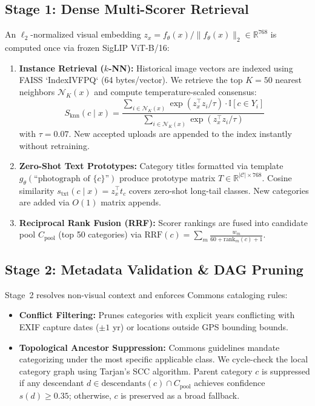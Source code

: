 \documentclass[10pt,a4paper,twocolumn]{article}
\begin{document}
\subsection{Stage 1: Dense Multi-Scorer Retrieval}
An $\ell_2$-normalized visual embedding $z_x = f_\theta(x) / \|f_\theta(x)\|_2 \in \mathbb{R}^{768}$ is computed once via frozen SigLIP ViT-B/16:
\begin{enumerate}[noitemsep,topsep=1pt,leftmargin=*]
  \item \textbf{Instance Retrieval ($k$-NN):} Historical image vectors are indexed using FAISS `IndexIVFPQ` (64 bytes/vector). We retrieve the top $K=50$ nearest neighbors $\mathcal{N}_K(x)$ and compute temperature-scaled consensus:
  $$S_{\text{knn}}(c \mid x) = \frac{\sum_{i \in \mathcal{N}_K(x)} \exp(z_x^\top z_i / \tau) \cdot \mathbb{I}[c \in Y_i]}{\sum_{i \in \mathcal{N}_K(x)} \exp(z_x^\top z_i / \tau)}$$
  with $\tau=0.07$. New accepted uploads are appended to the index instantly without retraining.
  \item \textbf{Zero-Shot Text Prototypes:} Category titles formatted via template $g_\theta(\text{``photograph of } \{c\}\text{''})$ produce prototype matrix $T \in \mathbb{R}^{|\mathcal{C}| \times 768}$. Cosine similarity $s_{\text{txt}}(c \mid x) = z_x^\top t_c$ covers zero-shot long-tail classes. New categories are added via $O(1)$ matrix appends.
  \item \textbf{Reciprocal Rank Fusion (RRF):} Scorer rankings are fused into candidate pool $C_{\text{pool}}$ (top 50 categories) via $\text{RRF}(c) = \sum_{m} \frac{w_m}{60 + \text{rank}_m(c) + 1}$.
\end{enumerate}

\subsection{Stage 2: Metadata Validation \& DAG Pruning}
Stage~2 resolves non-visual context and enforces Commons cataloging rules:
\begin{itemize}[noitemsep,topsep=1pt,leftmargin=*]
  \item \textbf{Conflict Filtering:} Prunes categories with explicit years conflicting with EXIF capture dates ($\pm 1$ yr) or locations outside GPS bounding bounds.
  \item \textbf{Topological Ancestor Suppression:} Commons guidelines mandate categorizing under the most specific applicable class. We cycle-check the local category graph using Tarjan's SCC algorithm. Parent category $c$ is suppressed if any descendant $d \in \text{descendants}(c) \cap C_{\text{pool}}$ achieves confidence $s(d) \ge 0.35$; otherwise, $c$ is preserved as a broad fallback.
\end{itemize}
\end{document}
